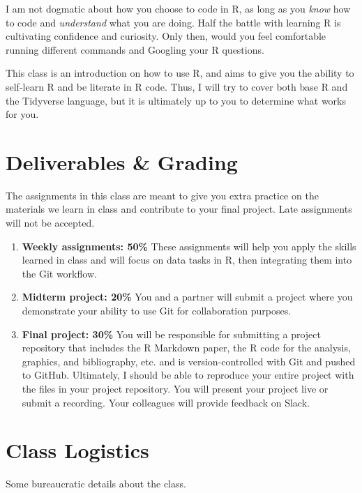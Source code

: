 \documentclass[11pt,]{article}
\begin{document}
I am not dogmatic about how you choose to code in R, as long as you
\emph{know} how to code and \emph{understand} what you are doing. Half
the battle with learning R is cultivating confidence and curiosity. Only
then, would you feel comfortable running different commands and Googling
your R questions.

This class is an introduction on how to use R, and aims to give you the
ability to self-learn R and be literate in R code. Thus, I will try to
cover both base R and the Tidyverse language, but it is ultimately up to
you to determine what works for you.

\hypertarget{deliverables-grading}{%
\section{Deliverables \& Grading}\label{deliverables-grading}}

The assignments in this class are meant to give you extra practice on
the materials we learn in class and contribute to your final project.
Late assignments will not be accepted.

\begin{enumerate}
\def\labelenumi{\arabic{enumi}.}
\item
  \textbf{Weekly assignments: 50\%} These assignments will help you
  apply the skills learned in class and will focus on data tasks in R,
  then integrating them into the Git workflow.
\item
  \textbf{Midterm project: 20\%} You and a partner will submit a project
  where you demonstrate your ability to use Git for collaboration
  purposes.
\item
  \textbf{Final project: 30\%} You will be responsible for submitting a
  project repository that includes the R Markdown paper, the R code for
  the analysis, graphics, and bibliography, etc. and is
  version-controlled with Git and pushed to GitHub. Ultimately, I should
  be able to reproduce your entire project with the files in your
  project repository. You will present your project live or submit a
  recording. Your colleagues will provide feedback on Slack.
\end{enumerate}

\hypertarget{class-logistics}{%
\section{Class Logistics}\label{class-logistics}}

Some bureaucratic details about the class.
\end{document}
